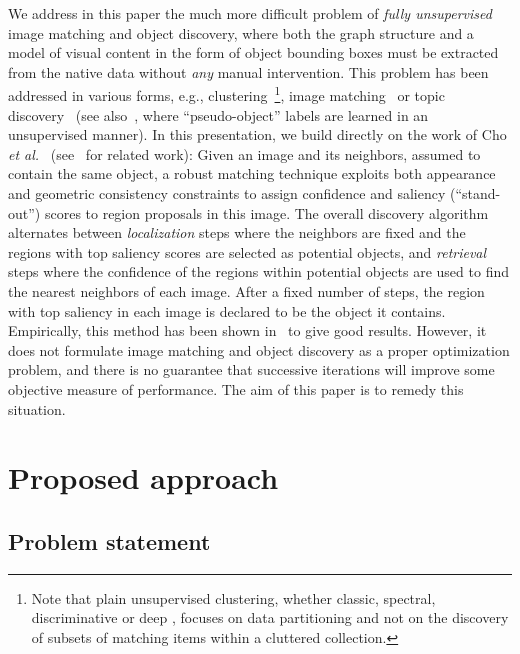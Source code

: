 \documentclass[10pt,twocolumn,letterpaper]{article}
\numberwithin{theorem}{section}
\begin{document}
We address in this paper the much more difficult problem of {\em fully
  unsupervised} image matching and object discovery, where both the
graph structure and a model of visual content in the form of object
bounding boxes must be extracted from the native data without {\em
  any} manual intervention. This problem has been addressed in various
forms, e.g., clustering~\cite{faktor2012clustering}\footnote{Note that plain unsupervised clustering, whether classic, spectral, discriminative or deep \cite{Diffrac,hershey2016deep,lloyd1982least,ng2002spectral}, focuses on data partitioning and not on the discovery of subsets of matching items within a cluttered collection.}, image
matching~\cite{Rubinstein2013} or topic
discovery~\cite{Russell06,sivic2008unsupervised} (see
also~\cite{BoJo17,Caron18}, where ``pseudo-object'' labels are learned
in an unsupervised manner). 
In this presentation, we build directly on
the work of Cho {\em et al.}~\cite{CKSP15} (see~\cite{Kwak2015} for
related work): Given an image and its neighbors, assumed to contain
the same object, a robust matching technique exploits both appearance
and geometric consistency constraints to assign confidence and
saliency (``stand-out'') scores to region proposals in this 
image.  The overall discovery algorithm alternates between {\em
  localization} steps where the neighbors are fixed and the regions
with top saliency scores are selected as potential objects, and {\em
  retrieval} steps where the confidence of the regions within
potential objects are used to find the nearest neighbors of each
image. After a fixed number of steps, the region with top saliency in
each image is declared to be the object it contains. Empirically, this
method has been shown in~\cite{CKSP15} to give good results. However,
it does not formulate image matching and object discovery as a proper
optimization problem, and there is no guarantee that successive
iterations will improve some objective measure of performance. The aim
of this paper is to remedy this situation.
 
\section{Proposed approach}
\subsection{Problem statement}
\end{document}
